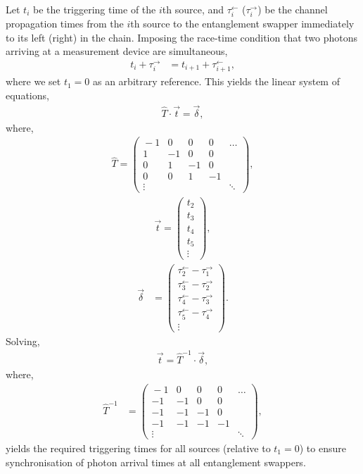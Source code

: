 Let $t_i$ be the triggering time of the $i$th source, and $\tau_i^\leftarrow$ ($\tau_i^\rightarrow$) be the channel propagation times from the $i$th source to the entanglement swapper immediately to its left (right) in the chain. Imposing the race-time condition that two photons arriving at a measurement device are simultaneous,
\begin{align}\label{eq:ent_sync_cond}
t_i + \tau_i^\rightarrow &= t_{i+1} + \tau_{i+1}^\leftarrow,	
\end{align}
where we set \mbox{$t_1=0$} as an arbitrary reference. This yields the linear system of equations,
\begin{align}
\hat{T}\cdot\vec{t} = \vec{\delta},
\end{align}
where,
\begin{align}
\hat{T} = \left(\begin{matrix}{}
 -1 & 0 & 0 & 0 &\dots \\
 1 & -1 & 0 & 0 & \\
 0 & 1 & -1 & 0 & \\
 0 & 0 & 1 & -1 & \\
 \vdots & & & & \ddots
\end{matrix}\right),
\end{align}
\begin{align}
\vec{t} = \left(\begin{matrix}{}
t_2\\
t_3\\
t_4\\
t_5\\
\vdots	
\end{matrix}\right),
\end{align}
\begin{align}
\vec\delta &= \left(\begin{matrix}{}
\tau_{2}^\leftarrow - \tau_1^\rightarrow	 \\
\tau_{3}^\leftarrow - \tau_2^\rightarrow	 \\
\tau_{4}^\leftarrow - \tau_3^\rightarrow	 \\
\tau_{5}^\leftarrow - \tau_4^\rightarrow	 \\
\vdots
\end{matrix}\right).
\end{align}
Solving,
\begin{align}\label{eq:repeater_trig_time_sol}
	\vec{t} = \hat{T}^{-1}\cdot\vec\delta,
\end{align}
where,
\begin{align}
	\hat{T}^{-1} & = \left(\begin{matrix}{}
 -1 & 0 & 0 & 0 &\dots \\
 -1 & -1 & 0 & 0 & \\
 -1 & -1 & -1 & 0 & \\
 -1 & -1 & -1 & -1 & \\
 \vdots & & & & \ddots
\end{matrix}\right),
\end{align}
yields the required triggering times for all sources (relative to \mbox{$t_1=0$}) to ensure synchronisation of photon arrival times at all entanglement swappers.

